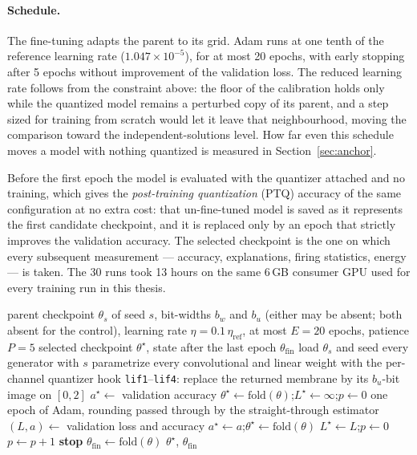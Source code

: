 \paragraph{Schedule.}
The fine-tuning adapts the parent to its grid. 
Adam runs at one tenth of the reference learning rate
($1.047 \times 10^{-5}$), for at most 20 epochs, with early stopping after 5
epochs without improvement of the validation loss. The reduced learning rate follows from
the constraint above: the floor of the calibration holds only while the
quantized model remains a perturbed copy of its parent, and a step sized for
training from scratch would let it leave that neighbourhood, moving the
comparison toward the independent-solutions level. How far even this schedule
moves a model with nothing quantized is measured in Section~\ref{sec:anchor}.

Before the first epoch the model is evaluated with the quantizer attached and no
training, which gives the \emph{post-training quantization} (PTQ) accuracy of the
same configuration at no extra cost: that un-fine-tuned model is saved as it represents the
first candidate checkpoint, and it is replaced only by an epoch that strictly
improves the validation accuracy. The selected checkpoint is the one on which
every subsequent measurement --- accuracy, explanations, firing statistics,
energy --- is taken. The 30 runs took 13 hours on the same 6\,GB consumer GPU
used for every training run in this thesis.


\begin{algorithm}[htbp]
\caption{Quantization-aware fine-tuning and checkpoint selection}
\label{alg:qat}
\begin{algorithmic}[1]
\REQUIRE parent checkpoint $\theta_s$ of seed $s$, bit-widths $b_w$ and $b_u$
         (either may be absent; both absent for the control), learning rate
         $\eta = 0.1\,\eta_{\mathrm{ref}}$, at most $E = 20$ epochs, patience $P = 5$
\ENSURE  selected checkpoint $\theta^{\star}$, state after the last epoch $\theta_{\mathrm{fin}}$
\STATE load $\theta_s$ and seed every generator with $s$
  \STATE parametrize every convolutional and linear weight with the per-channel quantizer
\ENDIF
{}
  \STATE hook \texttt{lif1}--\texttt{lif4}: replace the returned membrane by its
         $b_u$-bit image on $[0, 2]$
\ENDIF
\STATE $a^{\star} \gets$ validation accuracy 
\STATE $\theta^{\star} \gets \mathrm{fold}(\theta)$;\quad $L^{\star} \gets \infty$;\quad $p \gets 0$
  \STATE one epoch of Adam, rounding passed through by the straight-through estimator
  \STATE $(L, a) \gets$ validation loss and accuracy
    \STATE $a^{\star} \gets a$;\quad $\theta^{\star} \gets \mathrm{fold}(\theta)$
  \ENDIF
    \STATE $L^{\star} \gets L$;\quad $p \gets 0$
  \ELSE
    \STATE $p \gets p + 1$
  \ENDIF
    \STATE \textbf{stop}
  \ENDIF
\ENDFOR
\STATE $\theta_{\mathrm{fin}} \gets \mathrm{fold}(\theta)$
\RETURN $\theta^{\star}$, $\theta_{\mathrm{fin}}$
\end{algorithmic}
\end{algorithm}

